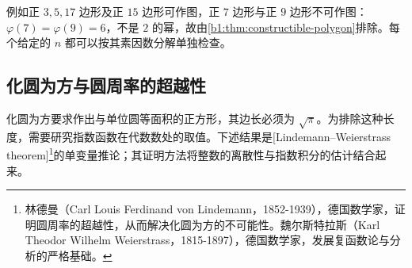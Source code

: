 例如正 \(3,5,17\) 边形及正 \(15\) 边形可作图，正 \(7\) 边形与正 \(9\) 边形不可作图：\(\varphi(7)=\varphi(9)=6\)，不是 \(2\) 的幂，故由\cref{b1:thm:constructible-polygon}排除。每个给定的 \(n\) 都可以按其素因数分解单独检查。

\subsection{化圆为方与圆周率的超越性}
\label{b1:subsec:2104:03}

化圆为方要求作出与单位圆等面积的正方形，其边长必须为 \(\sqrt\pi\)。为排除这种长度，需要研究指数函数在代数数处的取值。下述结果是[Lindemann--Weierstrass theorem]\footnote{林德曼（Carl Louis Ferdinand von Lindemann，1852-1939），德国数学家，证明圆周率的超越性，从而解决化圆为方的不可能性。魏尔斯特拉斯（Karl Theodor Wilhelm Weierstrass，1815-1897），德国数学家，发展复函数论与分析的严格基础。}的单变量推论；其证明方法将整数的离散性与指数积分的估计结合起来。

